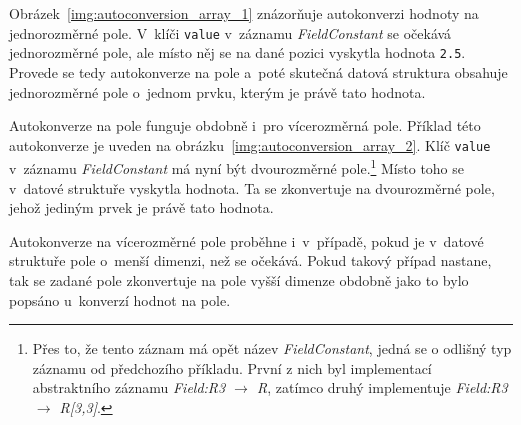 \documentclass[FM,bw,DP]{tulthesis}
\begin{document}
Obrázek~\ref{img:autoconversion_array_1} znázorňuje autokonverzi hodnoty na jednorozměrné pole. V~klíči \texttt{value} v~záznamu \textit{FieldConstant} se očekává jednorozměrné pole, ale místo něj se na dané pozici vyskytla hodnota \texttt{2.5}. Provede se tedy autokonverze na pole a~poté skutečná datová struktura obsahuje jednorozměrné pole o~jednom prvku, kterým je právě tato hodnota.

Autokonverze na pole funguje obdobně i~pro vícerozměrná pole. Příklad této autokonverze je uveden na obrázku~\ref{img:autoconversion_array_2}. Klíč \texttt{value} v~záznamu \textit{FieldConstant} má nyní být dvourozměrné pole.\footnote{Přes to, že tento záznam má opět název \textit{FieldConstant}, jedná se o odlišný typ záznamu od předchozího příkladu. První z nich byl implementací abstraktního záznamu \textit{Field:R3 $\rightarrow$ R}, zatímco druhý implementuje \textit{Field:R3 $\rightarrow$ R[3,3]}.} Místo toho se v~datové struktuře vyskytla hodnota. Ta se zkonvertuje na dvourozměrné pole, jehož jediným prvek je právě tato hodnota.

Autokonverze na vícerozměrné pole proběhne i~v~případě, pokud je v~datové struktuře pole o~menší dimenzi, než se očekává. Pokud takový případ nastane, tak se zadané pole zkonvertuje na pole vyšší dimenze obdobně jako to bylo popsáno u~konverzí hodnot na pole.

\end{document}
